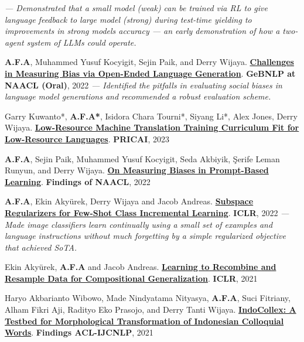 \begin{zitemize}
\vspace{0.3em}
\newline
{\textit{--- Demonstrated that a small model (\textit{weak}) can be trained via RL to give language feedback to large model (\textit{strong}) during test-time yielding to improvements in strong models accuracy --- an early demonstration of how a two-agent system of LLMs could operate.}}
\item \textbf{A.F.A}, Muhammed Yusuf Kocyigit, Sejin Paik, and Derry Wijaya.
\textbf{\href{https://arxiv.org/abs/2205.11601}{Challenges in Measuring Bias via Open-Ended Language Generation}}. \textbf{GeBNLP at NAACL (Oral)}, 2022
\vspace{0.3em}
\newline \textit{--- Identified the pitfalls in evaluating social biases in language model generations and recommended a robust evaluation scheme.}
\item Garry Kuwanto*, \textbf{A.F.A*}, Isidora Chara Tourni*, Siyang Li*, Alex Jones, Derry Wijaya. \textbf{\href{https://arxiv.org/pdf/2103.13272}{Low-Resource Machine Translation Training Curriculum Fit for Low-Resource Languages}}. \textbf{PRICAI}, 2023
\item \textbf{A.F.A}, Sejin Paik, Muhammed Yusuf Kocyigit, Seda Akbiyik, Şerife Leman Runyun, and Derry Wijaya. \textbf{\href{https://arxiv.org/abs/2205.11605}{On Measuring Biases in Prompt-Based Learning}}. \textbf{Findings of NAACL}, 2022
\item \textbf{A.F.A}, Ekin Akyürek, Derry Wijaya and Jacob Andreas. \textbf{\href{https://arxiv.org/abs/2110.07059}{Subspace Regularizers for Few-Shot Class Incremental Learning}}. \textbf{ICLR}, 2022
\vspace{0.3em}
\newline
\textit{--- Made image classifiers learn continually using a small set of examples and language instructions without much forgetting by a simple regularized objective that achieved SoTA.}

\item Ekin Akyürek, \textbf{A.F.A} and Jacob Andreas. \textbf{\href{https://arxiv.org/abs/2010.03706}{Learning to Recombine and Resample Data for Compositional Generalization}}. \textbf{ICLR}, 2021

\item Haryo Akbarianto Wibowo, Made Nindyatama Nityasya, \textbf{A.F.A}, Suci Fitriany, Alham Fikri Aji, Radityo Eko Prasojo, and Derry Tanti Wijaya. \textbf{\href{https://aclanthology.org/2021.findings-acl.280/}{IndoCollex: A Testbed for Morphological Transformation of Indonesian Colloquial Words}}. \textbf{Findings ACL-IJCNLP}, 2021


\end{zitemize}
